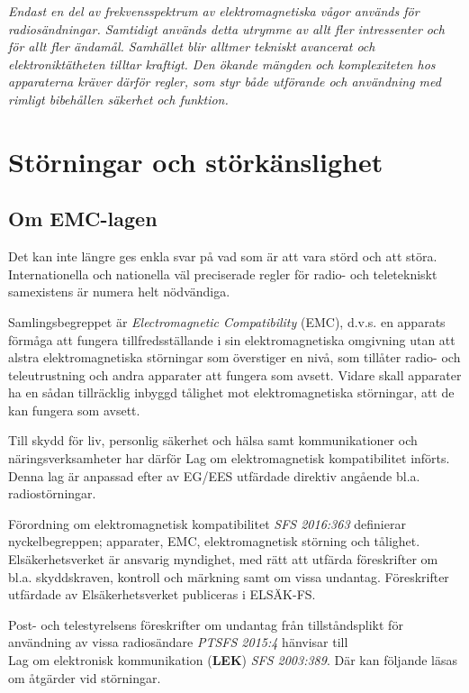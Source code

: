 \emph{Endast en del av frekvensspektrum av elektromagnetiska vågor används för
radiosändningar. Samtidigt används detta utrymme av allt fler intressenter och
för allt fler ändamål. Samhället blir alltmer tekniskt avancerat och
elektroniktätheten tilltar kraftigt. Den ökande mängden och komplexiteten hos
apparaterna kräver därför regler, som styr både utförande och användning med
rimligt bibehållen säkerhet och funktion.}

\section{Störningar och störkänslighet}

\subsection{Om EMC-lagen}
\label{EMC-lagen}

Det kan inte längre ges enkla svar på vad som är att vara störd och att störa.
Internationella och nationella väl preciserade regler för radio- och
teletekniskt samexistens är numera helt nödvändiga.

Samlingsbegreppet är \emph{Electromagnetic Compatibility} (EMC), d.v.s. en
apparats förmåga att fungera tillfredsställande i sin elektromagnetiska
omgivning utan att alstra elektromagnetiska störningar som överstiger en nivå,
som tillåter radio- och teleutrustning och andra apparater att fungera som
avsett. Vidare skall apparater ha en sådan tillräcklig inbyggd tålighet mot
elektromagnetiska störningar, att de kan fungera som avsett.

Till skydd för liv, personlig säkerhet och hälsa samt kommunikationer och
näringsverksamheter har därför Lag om elektromagnetisk kompatibilitet införts.
Denna lag är anpassad efter av EG/EES utfärdade direktiv angående bl.a.
radiostörningar.

Förordning om elektromagnetisk kompatibilitet \emph{SFS 2016:363} definierar
nyckelbegreppen; apparater, EMC, elektromagnetisk störning och tålighet.
Elsäkerhetsverket är ansvarig myndighet, med rätt att utfärda föreskrifter om
bl.a. skyddskraven, kontroll och märkning samt om vissa undantag.
Föreskrifter utfärdade av Elsäkerhetsverket publiceras i ELSÄK-FS.

Post- och telestyrelsens föreskrifter om undantag från tillståndsplikt för användning av vissa radiosändare \emph{PTSFS 2015:4} hänvisar till\\
Lag om elektronisk kommunikation (\textbf{LEK}) \emph{SFS 2003:389}. Där kan följande läsas om åtgärder vid störningar.  

